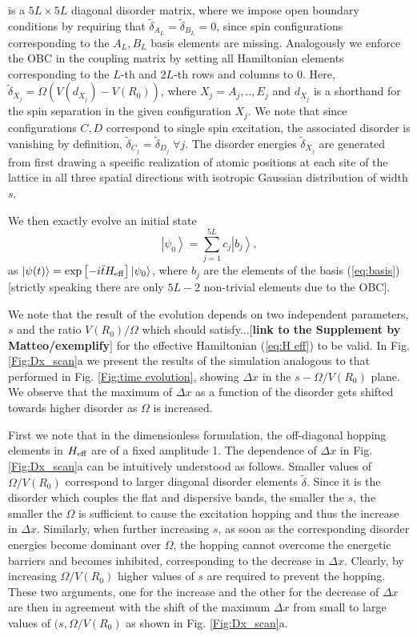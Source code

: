 \documentclass[prl,aps,twocolumn,showpacs,superscriptaddress,longbibliography]{revtex4-1}
\newcommand{\ran}{\right\rangle}
\newcommand{\ket}[1]{\left| #1 \ran}
\begin{document}
is a $5L \times 5L$ diagonal disorder matrix, where we impose open boundary conditions by requiring that $\tilde{\delta}_{A_L} = \tilde{\delta}_{B_L}=0$, since spin configurations corresponding to the $A_L,B_L$ basis elements are missing. Analogously we enforce the OBC in the coupling matrix by setting all Hamiltonian elements corresponding to the $L$-th and $2L$-th rows and columns to 0. Here, $\tilde{\delta}_{X_j} = \Omega \left(V(d_{X_j})-V(R_0) \right)$, where $X_j=A_j,..,E_j$ and $d_{X_j}$ is a shorthand for the spin separation in the given configuration $X_j$. We note that since configurations $C,D$ correspond to single spin excitation, the associated disorder is vanishing by definition, $\tilde{\delta}_{C_j} = \tilde{\delta}_{D_j} \; \forall j$. The disorder energies $\tilde{\delta}_{X_j}$ are generated from first drawing a specific realization of atomic positions at each site of the lattice in all three spatial directions with isotropic Gaussian distribution of width $s$.

We then exactly evolve an initial state
\begin{equation}
	\ket{\psi_0} = \sum_{j=1}^{5L} c_j \ket{b_j},
\end{equation}
as $\ket{\psi(t)} = {\rm exp}\left[ -i \tilde{t} H_{\rm eff}\right] \ket{\psi_0}$, where $b_j$ are the elements of the basis (\ref{eq:basis}) [strictly speaking there are only $5L-2$ non-trivial elements due to the OBC].

We note that the result of the evolution depends on two independent parameters, $s$ and the ratio $V(R_0)/\Omega$ which should satisfy...[{\bf link to the Supplement by Matteo/exemplify}] for the effective Hamiltonian (\ref{eq:H eff}) to be valid. In Fig. \ref{Fig:Dx_scan}a we present the results of the simulation analogous to that performed in Fig. \ref{Fig:time evolution}, showing $\Delta x$ in the $s - \Omega/V(R_0)$ plane. We observe that the maximum of $\Delta x$ as a function of the disorder gets shifted towards higher disorder as $\Omega$ is increased. 

First we note that in the dimensionless formulation, the off-diagonal hopping elements in $H_{\rm eff}$ are of a fixed amplitude 1. The dependence of $\Delta x$ in Fig. \ref{Fig:Dx_scan}a can be intuitively understood as follows. Smaller values of $\Omega/V(R_0)$ correspond to larger diagonal disorder elements $\tilde{\delta}$. Since it is the disorder which couples the flat and dispersive bands, the smaller the $s$, the smaller the $\Omega$ is sufficient to cause the excitation hopping and thus the increase in $\Delta x$. Similarly, when further increasing $s$, as soon as the corresponding disorder energies become dominant over $\Omega$, the hopping cannot overcome the energetic barriers and becomes inhibited, corresponding to the decrease in $\Delta x$. Clearly, by increasing $\Omega/V(R_0)$ higher values of $s$ are required to prevent the hopping. These two arguments, one for the increase and the other for the decrease of $\Delta x$ are then in agreement with the shift of the maximum $\Delta x$ from small to large values of $(s,\Omega/V(R_0)$ as shown in Fig. \ref{Fig:Dx_scan}a.
\end{document}
